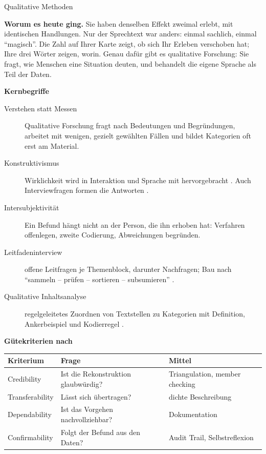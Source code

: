 \begin{handout}{Qualitative Methoden}

\textbf{Worum es heute ging.} Sie haben denselben Effekt zweimal erlebt,
mit identischen Handlungen. Nur der Sprechtext war anders: einmal
sachlich, einmal \enquote{magisch}. Die Zahl auf Ihrer Karte zeigt, ob
sich Ihr Erleben verschoben hat; Ihre drei Wörter zeigen, worin. Genau
dafür gibt es qualitative Forschung: Sie fragt, wie Menschen eine
Situation deuten, und behandelt die eigene Sprache als Teil der Daten.

\textbf{Kernbegriffe}
\begin{description}
  \item[Verstehen statt Messen] Qualitative Forschung fragt nach
    Bedeutungen und Begründungen, arbeitet mit wenigen, gezielt gewählten
    Fällen und bildet Kategorien oft erst am Material.
  \item[Konstruktivismus] Wirklichkeit wird in Interaktion und Sprache
    mit hervorgebracht \parencite{bergerluckmann1966}. Auch Interviewfragen
    formen die Antworten \parencite{loftuspalmer1974}.
  \item[Intersubjektivität] Ein Befund hängt nicht an der Person, die ihn
    erhoben hat: Verfahren offenlegen, zweite Codierung, Abweichungen
    begründen.
  \item[Leitfadeninterview] offene Leitfragen je Themenblock, darunter
    Nachfragen; Bau nach \enquote{sammeln -- prüfen -- sortieren --
    subsumieren} \parencite{helfferich2011qualitaet}.
  \item[Qualitative Inhaltsanalyse] regelgeleitetes Zuordnen von
    Textstellen zu Kategorien mit Definition, Ankerbeispiel und
    Kodierregel \parencite{mayring2015inhaltsanalyse}.
\end{description}

\textbf{Gütekriterien nach \textcite{lincolnguba1985naturalistic}}

\begin{center}
\small
\begin{tabular}{@{}lll@{}}
\toprule
\textbf{Kriterium} & \textbf{Frage} & \textbf{Mittel} \\
\midrule
Credibility & Ist die Rekonstruktion glaubwürdig? & Triangulation, member checking \\
Transferability & Lässt sich übertragen? & dichte Beschreibung \\
Dependability & Ist das Vorgehen nachvollziehbar? & Dokumentation \\
Confirmability & Folgt der Befund aus den Daten? & Audit Trail, Selbstreflexion \\
\bottomrule
\end{tabular}
\end{center}


\end{handout}
